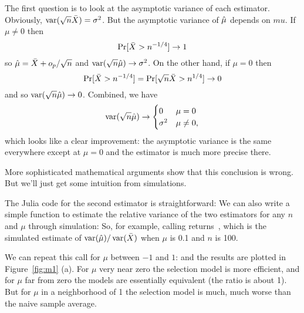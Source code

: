 \begin{itemize}[leftmargin=0pt]
\begin{ex}
    The first question is to look at the asymptotic variance of each
    estimator.  Obviously, $\operatorname{var}(\sqrt{n} \bar{X}) = \sigma^2$.  But the
    asymptotic variance of $\hat{\mu}$ depends on $mu$.  If $\mu \neq 0$
    then
    \begin{equation*}
      \operatorname{Pr}[ \bar{X} > n^{-1/4} ] \to 1
    \end{equation*}
    so $\hat{\mu} = \bar{X} + o_p/\sqrt{n}$ and $\operatorname{var}(\sqrt{n} \hat{\mu}) \to
    \sigma^2$.  On the other hand, if $\mu = 0$ then
    \begin{equation*}
      \operatorname{Pr}[ \bar{X} > n^{-1/4} ] = \operatorname{Pr}[ \sqrt{n} \bar{X} > n^{1/4} ] \to 0
    \end{equation*}
    and so $\operatorname{var}(\sqrt{n} \hat{\mu}) \to 0$.  Combined, we have
    \begin{equation*}
      \operatorname{var}(\sqrt{n} \hat{\mu}) \to
      \begin{cases}
        0        & \mu = 0 \\
        \sigma^2 & \mu \neq 0,
      \end{cases}
    \end{equation*}
    which looks like a clear improvement: the asymptotic variance is
    the same everywhere except at $\mu = 0$ and the estimator is much
    more precise there.

    More sophisticated mathematical arguments show that this
    conclusion is wrong.  But we'll just get some intuition from
    simulations.

    The Julia code \citep{BKS12} for the second estimator is
    straightforward:
    \renewcommand*\FancyVerbStartString{## block 1}
    We can also write a simple function to estimate the relative
    variance of the two estimators for any $n$ and $\mu$ through
    simulation:
    \renewcommand*\FancyVerbStartString{## block 2}
    So, for example, calling
    \renewcommand*\FancyVerbStartString{## block 3}
    returns~\exampleratio, which is the simulated estimate of $\operatorname{var}(\hat{\mu})
    / \operatorname{var}(\bar{X})$ when $\mu$ is 0.1 and $n$ is 100.

    We can repeat this call for $\mu$ between $-1$ and $1$:
    \renewcommand*\FancyVerbStartString{## block 4}
    and the results are plotted in Figure~\ref{fig:m1} (a).  For $\mu$
    very near zero the selection model is more efficient, and for
    $\mu$ far from zero the models are essentially equivalent (the
    ratio is about 1).  But for $\mu$ in a neighborhood of 1 the
    selection model is much, much worse than the naive sample average.


\end{ex}
\end{itemize}
